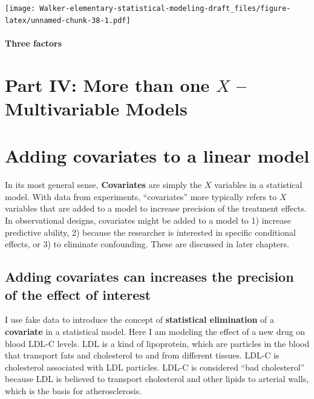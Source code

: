\documentclass[]{book}
\begin{document}
\texttt{[image: Walker-elementary-statistical-modeling-draft\_files/figure-latex/unnamed-chunk-38-1.pdf]}

\subsubsection{Three factors}\label{three-factors}

\chapter*{\texorpdfstring{Part IV: More than one \(X\) -- Multivariable
Models}{Part IV: More than one X -- Multivariable Models}}\label{part-iv-more-than-one-x-multivariable-models}

\chapter{Adding covariates to a linear
model}\label{adding-covariates-to-a-linear-model}

In its most general sense, \textbf{Covariates} are simply the \(X\)
variables in a statistical model. With data from experiments,
``covariates'' more typically refers to \(X\) variables that are added
to a model to increase precision of the treatment effects. In
observational designs, covariates might be added to a model to 1)
increase predictive ability, 2) because the researcher is interested in
specific conditional effects, or 3) to eliminate confounding. These are
discussed in later chapters.

\section{Adding covariates can increases the precision of the effect of
interest}\label{adding-covariates-can-increases-the-precision-of-the-effect-of-interest}

I use fake data to introduce the concept of \textbf{statistical
elimination} of a \textbf{covariate} in a statistical model. Here I am
modeling the effect of a new drug on blood LDL-C levels. LDL is a kind
of lipoprotein, which are particles in the blood that transport fats and
cholesterol to and from different tissues. LDL-C is cholesterol
associated with LDL particles. LDL-C is considered ``bad cholesterol''
because LDL is believed to transport cholesterol and other lipids to
arterial walls, which is the basis for atherosclerosis.
\end{document}
